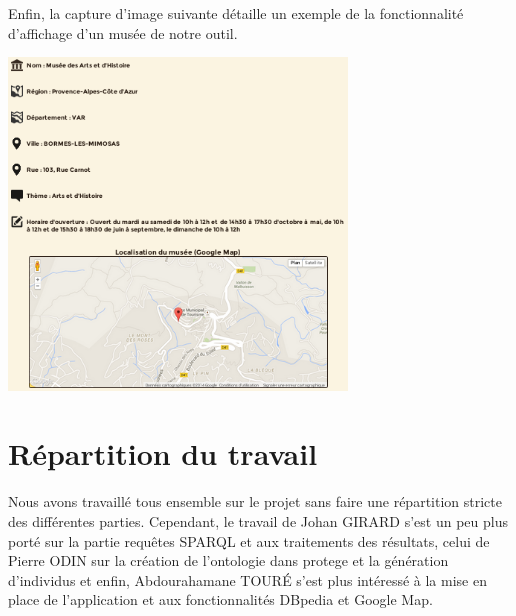 \documentclass{article}
\begin{document}
Enfin, la capture d'image suivante détaille un exemple de
la fonctionnalité d'affichage d'un musée de notre outil.
\begin{center}
\includegraphics[width=9cm]{trouveMuseeFiche.png}
\end{center}


\section{Répartition du travail}

Nous avons travaillé tous ensemble sur le projet sans faire une répartition
stricte des différentes parties. Cependant, le travail de Johan GIRARD s'est un
peu plus porté sur la partie requêtes SPARQL et aux traitements
des résultats, celui de Pierre ODIN sur la création de l'ontologie dans protege et la génération d'individus et
enfin, Abdourahamane TOURÉ s'est plus intéressé à la mise en place de
l'application et aux fonctionnalités DBpedia et Google Map.
\end{document}

